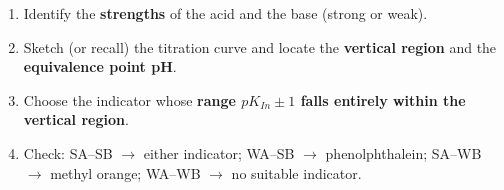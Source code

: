 \documentclass[11pt]{article}
\begin{document}
\begin{methode}
\begin{enumerate}
\item Identify the \textbf{strengths} of the acid and the base (strong or weak).
\item Sketch (or recall) the titration curve and locate the \textbf{vertical region} and the \textbf{equivalence point pH}.
\item Choose the indicator whose \textbf{range $pK_{In}\pm1$ falls entirely within the vertical region}.
\item Check: SA--SB $\rightarrow$ either indicator; WA--SB $\rightarrow$ phenolphthalein; SA--WB $\rightarrow$ methyl orange; WA--WB $\rightarrow$ no suitable indicator.
\end{enumerate}
\end{methode}
\end{document}
